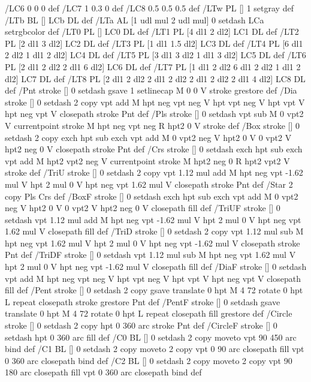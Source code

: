 /LC6 {0 0 0} def
/LC7 {1 0.3 0} def
/LC8 {0.5 0.5 0.5} def
/LTw {PL [] 1 setgray} def
/LTb {BL [] LCb DL} def
/LTa {AL [1 udl mul 2 udl mul] 0 setdash LCa setrgbcolor} def
/LT0 {PL [] LC0 DL} def
/LT1 {PL [4 dl1 2 dl2] LC1 DL} def
/LT2 {PL [2 dl1 3 dl2] LC2 DL} def
/LT3 {PL [1 dl1 1.5 dl2] LC3 DL} def
/LT4 {PL [6 dl1 2 dl2 1 dl1 2 dl2] LC4 DL} def
/LT5 {PL [3 dl1 3 dl2 1 dl1 3 dl2] LC5 DL} def
/LT6 {PL [2 dl1 2 dl2 2 dl1 6 dl2] LC6 DL} def
/LT7 {PL [1 dl1 2 dl2 6 dl1 2 dl2 1 dl1 2 dl2] LC7 DL} def
/LT8 {PL [2 dl1 2 dl2 2 dl1 2 dl2 2 dl1 2 dl2 2 dl1 4 dl2] LC8 DL} def
/Pnt {stroke [] 0 setdash gsave 1 setlinecap M 0 0 V stroke grestore} def
/Dia {stroke [] 0 setdash 2 copy vpt add M
  hpt neg vpt neg V hpt vpt neg V
  hpt vpt V hpt neg vpt V closepath stroke
  Pnt} def
/Pls {stroke [] 0 setdash vpt sub M 0 vpt2 V
  currentpoint stroke M
  hpt neg vpt neg R hpt2 0 V stroke
 } def
/Box {stroke [] 0 setdash 2 copy exch hpt sub exch vpt add M
  0 vpt2 neg V hpt2 0 V 0 vpt2 V
  hpt2 neg 0 V closepath stroke
  Pnt} def
/Crs {stroke [] 0 setdash exch hpt sub exch vpt add M
  hpt2 vpt2 neg V currentpoint stroke M
  hpt2 neg 0 R hpt2 vpt2 V stroke} def
/TriU {stroke [] 0 setdash 2 copy vpt 1.12 mul add M
  hpt neg vpt -1.62 mul V
  hpt 2 mul 0 V
  hpt neg vpt 1.62 mul V closepath stroke
  Pnt} def
/Star {2 copy Pls Crs} def
/BoxF {stroke [] 0 setdash exch hpt sub exch vpt add M
  0 vpt2 neg V hpt2 0 V 0 vpt2 V
  hpt2 neg 0 V closepath fill} def
/TriUF {stroke [] 0 setdash vpt 1.12 mul add M
  hpt neg vpt -1.62 mul V
  hpt 2 mul 0 V
  hpt neg vpt 1.62 mul V closepath fill} def
/TriD {stroke [] 0 setdash 2 copy vpt 1.12 mul sub M
  hpt neg vpt 1.62 mul V
  hpt 2 mul 0 V
  hpt neg vpt -1.62 mul V closepath stroke
  Pnt} def
/TriDF {stroke [] 0 setdash vpt 1.12 mul sub M
  hpt neg vpt 1.62 mul V
  hpt 2 mul 0 V
  hpt neg vpt -1.62 mul V closepath fill} def
/DiaF {stroke [] 0 setdash vpt add M
  hpt neg vpt neg V hpt vpt neg V
  hpt vpt V hpt neg vpt V closepath fill} def
/Pent {stroke [] 0 setdash 2 copy gsave
  translate 0 hpt M 4 {72 rotate 0 hpt L} repeat
  closepath stroke grestore Pnt} def
/PentF {stroke [] 0 setdash gsave
  translate 0 hpt M 4 {72 rotate 0 hpt L} repeat
  closepath fill grestore} def
/Circle {stroke [] 0 setdash 2 copy
  hpt 0 360 arc stroke Pnt} def
/CircleF {stroke [] 0 setdash hpt 0 360 arc fill} def
/C0 {BL [] 0 setdash 2 copy moveto vpt 90 450 arc} bind def
/C1 {BL [] 0 setdash 2 copy moveto
	2 copy vpt 0 90 arc closepath fill
	vpt 0 360 arc closepath} bind def
/C2 {BL [] 0 setdash 2 copy moveto
	2 copy vpt 90 180 arc closepath fill
	vpt 0 360 arc closepath} bind def
